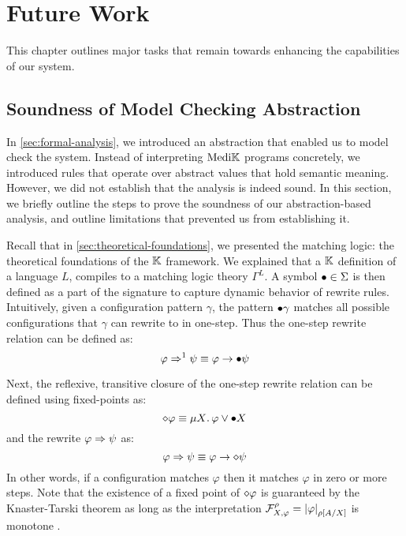 \chapter{Future Work}\label{chapter:future-work}

This chapter outlines major tasks that remain towards enhancing the capabilities
of our system.

\section{Soundness of Model Checking Abstraction}\label{sec:abstraction-soundness}

In \autoref{sec:formal-analysis}, we introduced an abstraction that enabled us
to model check the system. Instead of interpreting $\text{Medi}\mathbb{K}{}{}$ programs
concretely, we introduced rules that operate over abstract values
that hold semantic meaning. However, we did not establish that the analysis is
indeed sound. In this section, we briefly outline the steps to prove the
soundness of our abstraction-based analysis, and outline limitations that
prevented us from establishing it.

Recall that in \autoref{sec:theoretical-foundations}, we presented the
matching logic: the theoretical foundations of the $\mathbb{K}$ framework. We explained
that a $\mathbb{K}$ definition of a language $L$, compiles to a matching logic theory
$\Gamma^L$. A symbol ${\bullet} \in \Sigma$ is then defined as a part of the
signature to capture dynamic behavior of rewrite rules.
Intuitively, given a configuration
pattern $\gamma$, the pattern ${\bullet} \gamma$ matches all possible
configurations that $\gamma$ can rewrite to in one-step. Thus
the one-step rewrite relation can be defined as:
$$
  \varphi \Rightarrow^1 \psi \equiv \varphi \to {\bullet} \psi
$$

Next, the reflexive, transitive closure of the one-step rewrite relation
can be defined using fixed-points as:
$$
  \diamond \varphi \equiv \mu X \mathord{.\,} \varphi \vee {\bullet} X
$$
and the rewrite $\varphi \Rightarrow \psi$ as:
$$
  \varphi \Rightarrow \psi \equiv \varphi \to \diamond \psi
$$
In other words, if a configuration matches
$\varphi$ then it matches $\varphi$ in zero or more steps.
Note that the existence of a fixed point of $\diamond\varphi$
is guaranteed by the Knaster-Tarski theorem as long as the interpretation
$\mathcal{F}^{\rho}_{X,\varphi} = \left|\varphi\right|_{\rho\left[A / X\right]}$
is monotone \cite{ChenLICS19}.

